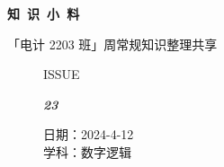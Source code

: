\documentclass[UTF8]{ctexart}
\newcommand\Black[1]{\textcolor[gray]{0.3}{#1}}
\newcommand\Brown[1]{\textcolor[HTML]{998A4E}{#1}}
\newcommand\IssueNumber{23}
\newcommand\Date{2024-4-12}
\newcommand\Subject{数字逻辑}
\begin{document}
\BgThispage
\begin{center}
\phantom{...}

{\Large\textcolor{brown!40!white}{}}

\vspace{-2em}

{\Huge\bfseries\TitleFont \Black{知\ 识\ 小\ 料}}


\vspace{-0.1cm}
{\footnotesize \Brown{「电计 2203 班」周常规知识整理共享}}
\end{center}

\vspace{-0.5cm}


\begin{figure}[H]
\hspace{1cm}
\begin{minipage}[t]{0.3\textwidth}
\centering
    \Brown{\Genshin ISSUE}

    \vspace{-0.6cm}
    \Huge \Issue\slshape\bfseries\Black{\IssueNumber}
\end{minipage}
\hfill
\begin{minipage}[t]{0.35\textwidth}
\small
\centering
    \Brown{日期：\Date} \\
\vspace{-0.1cm}
    \Brown{学科：\Subject} \\
\end{minipage}
\hspace{0.8cm}
\end{figure}
\end{document}

